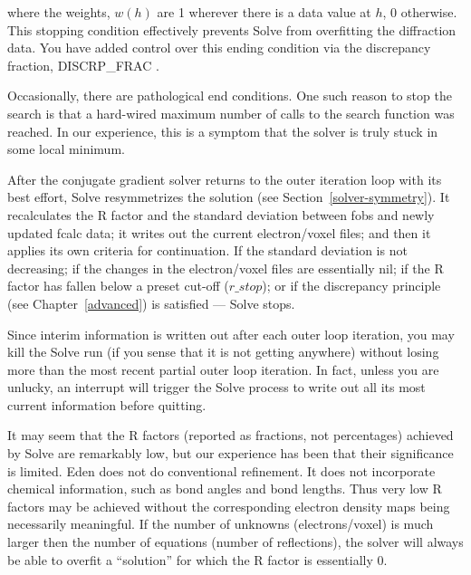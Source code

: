\documentclass{report}
\begin{document}
where the weights, $w(h)$ are 1 wherever there is a data value at $h$,
0 otherwise.  This stopping condition effectively prevents Solve from
overfitting the diffraction data.  You  have added control over this ending condition
via the discrepancy fraction, DISCRP\_FRAC .

\vspace {0.1in}

Occasionally, there are pathological end conditions.  One such
reason to stop the search is that a hard-wired maximum number of
calls to the search function was reached.  
In our experience, this is a symptom that the solver is truly stuck in some
local minimum.  

\vspace {0.1in}

After the conjugate gradient solver
returns to the outer iteration loop with its best effort, Solve
resymmetrizes the solution (see Section~\ref{solver-symmetry}).  
It recalculates the R factor and the standard deviation between fobs and
newly updated fcalc data; it writes out the current electron/voxel files;
and then it applies its own criteria for 
continuation.  If the standard deviation is not decreasing; if the
changes in the electron/voxel files are essentially nil; if the R
factor has fallen below a preset cut-off ($r\_stop$);
or if the discrepancy principle (see Chapter~\ref{advanced}) is satisfied ---  
Solve stops.  

\vspace {0.1in}

Since interim information is written out after each outer loop iteration, 
you may kill the Solve run (if you sense that it is not getting anywhere)
without losing more than the most recent partial outer loop iteration.
In fact, unless you are unlucky, an interrupt will trigger the Solve process to
write out all its most current information before quitting.

\vspace {0.1in}

It may seem that the R factors (reported as fractions, not percentages)
achieved by Solve are remarkably low, but our experience
has been that their significance is limited.  Eden does not do conventional
refinement.  It does not incorporate chemical information, such as bond
angles and bond lengths.  Thus very low R factors may be achieved without 
the corresponding electron density maps being necessarily meaningful.
If the number of unknowns (electrons/voxel) is much larger then
the number of equations (number of reflections), the solver will always be
able to overfit a ``solution'' for which the R factor is essentially 0.
\end{document}
